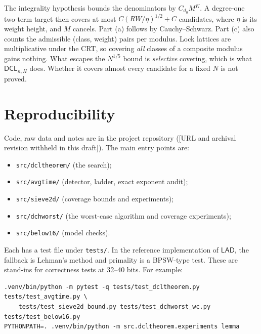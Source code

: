 \documentclass[11pt]{amsart}
\theoremstyle{definition}
\newcommand{\DCL}{\textsf{DCL}}
\newcommand{\LAD}{\textsf{LAD}}
\begin{document}
The integrality hypothesis bounds the denominators by $C_{d_0}M^{K}$. A degree-one two-term
target then covers at most $C(RW/\eta)^{1/2}+C$ candidates, where $\eta$ is its weight height, and
$M$ cancels. Part (a) follows by Cauchy--Schwarz. Part (c) also counts the admissible (class,
weight) pairs per modulus. Lock lattices are multiplicative under the CRT, so covering \emph{all}
classes of a composite modulus gains nothing. What escapes the $N^{1/5}$ bound is
\emph{selective} covering, which is what $\DCL_{n,H}$ does. Whether it covers almost every
candidate for a fixed $N$ is not proved.

\section{Reproducibility}
Code, raw data and notes are in the project repository ([URL and archival revision withheld in
this draft]). The main entry points are:
\begin{itemize}
\item \texttt{src/dcltheorem/} (the search);
\item \texttt{src/avgtime/} (detector, ladder, exact exponent audit);
\item \texttt{src/sieve2d/} (coverage bounds and experiments);
\item \texttt{src/dchworst/} (the worst-case algorithm and coverage experiments);
\item \texttt{src/below16/} (model checks).
\end{itemize}
Each has a test file under \texttt{tests/}. In the reference implementation of $\LAD$, the
fallback is Lehman's method and primality is a BPSW-type test. These are stand-ins for
correctness tests at 32--40 bits. For example:
\begin{verbatim}
.venv/bin/python -m pytest -q tests/test_dcltheorem.py tests/test_avgtime.py \
    tests/test_sieve2d_bound.py tests/test_dchworst_wc.py tests/test_below16.py
PYTHONPATH=. .venv/bin/python -m src.dcltheorem.experiments lemma
\end{verbatim}



\end{document}
